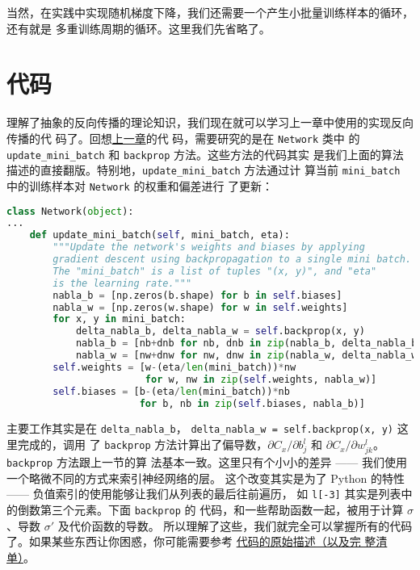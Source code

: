 当然，在实践中实现随机梯度下降，我们还需要一个产生小批量训练样本的循环，还有就是
多重训练周期的循环。这里我们先省略了。

\section{代码}
\label{sec:the_code_for_backpropagation}

理解了抽象的反向传播的理论知识，我们现在就可以学习上一章中使用的实现反向传播的代
码了。回想\hyperref[sec:implementing_our_network_to_classify_digits]{上一章}的代
码，需要研究的是在 \lstinline!Network! 类中
的 \lstinline!update_mini_batch! 和 \lstinline!backprop! 方法。这些方法的代码其实
是我们上面的算法描述的直接翻版。特别地，\lstinline!update_mini_batch! 方法通过计
算当前 \lstinline!mini_batch! 中的训练样本对 \lstinline!Network! 的权重和偏差进行
了更新：

\begin{lstlisting}[language=Python]
class Network(object):
...
    def update_mini_batch(self, mini_batch, eta):
        """Update the network's weights and biases by applying
        gradient descent using backpropagation to a single mini batch.
        The "mini_batch" is a list of tuples "(x, y)", and "eta"
        is the learning rate."""
        nabla_b = [np.zeros(b.shape) for b in self.biases]
        nabla_w = [np.zeros(w.shape) for w in self.weights]
        for x, y in mini_batch:
            delta_nabla_b, delta_nabla_w = self.backprop(x, y)
            nabla_b = [nb+dnb for nb, dnb in zip(nabla_b, delta_nabla_b)]
            nabla_w = [nw+dnw for nw, dnw in zip(nabla_w, delta_nabla_w)]
        self.weights = [w-(eta/len(mini_batch))*nw 
                        for w, nw in zip(self.weights, nabla_w)]
        self.biases = [b-(eta/len(mini_batch))*nb 
                       for b, nb in zip(self.biases, nabla_b)]
\end{lstlisting}
        
主要工作其实是在 \lstinline!delta_nabla_b!，%
\lstinline!delta_nabla_w = self.backprop(x, y)! 这里完成的，调用
了 \lstinline!backprop! 方法计算出了偏导数，$\partial C_x/\partial
b_j^l$ 和 $\partial C_x/\partial w_{jk}^l$。\lstinline!backprop! 方法跟上一节的算
法基本一致。这里只有个小小的差异 —— 我们使用一个略微不同的方式来索引神经网络的层。
这个改变其实是为了 Python 的特性 —— 负值索引的使用能够让我们从列表的最后往前遍历，
如 \lstinline!l[-3]!  其实是列表中的倒数第三个元素。下面 \lstinline!backprop! 的
代码，和一些帮助函数一起，被用于计算 $\sigma$、导数 $\sigma'$ 及代价函数的导数。
所以理解了这些，我们就完全可以掌握所有的代码了。如果某些东西让你困惑，你可能需要参考%
\hyperref[sec:implementing_our_network_to_classify_digits]{代码的原始描述（以及完
  整清单）}。

